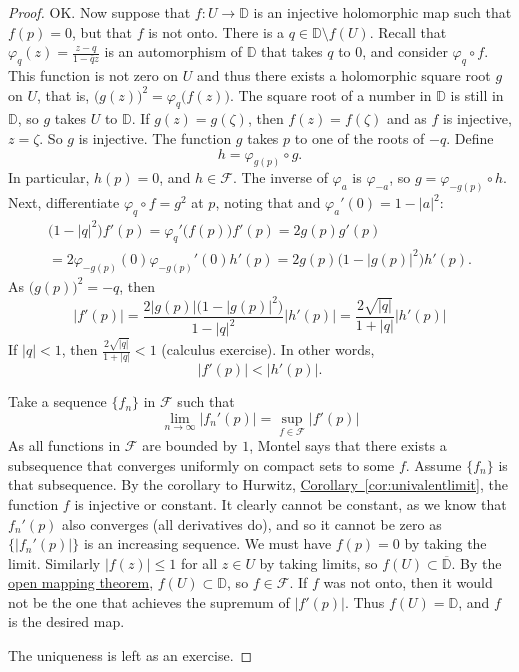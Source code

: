 \documentclass[12pt,openany]{book}
\newcommand{\sabs}[1]{\lvert {#1} \rvert}
\newcommand{\D}{{\mathbb{D}}}
\newcommand{\sF}{{\mathscr{F}}}
\theoremstyle{plain}
\theoremstyle{remark}
\theoremstyle{definition}
\theoremstyle{exercise}
\theoremstyle{example}
\newcommand{\corref}[1]{\hyperref[#1]{Corollary~\ref*{#1}}}
\begin{document}
\begin{proof}
OK.  Now suppose that $f \colon U \to \D$ is an injective holomorphic map
such that $f(p) = 0$, but that $f$ is not onto.  There is a
$q \in \D \setminus f(U)$.
Recall that
$\varphi_q(z) = \frac{z-q}{1-\bar{q}z}$ is an automorphism of $\D$ that
takes $q$ to $0$, and consider $\varphi_q \circ f$.  This function is not
zero on $U$ and thus
there exists a holomorphic square root $g$ on $U$, that is,
${\bigl(g(z)\bigr)}^2 = \varphi_q\bigl(f(z)\bigr)$.
The square root of a number in $\D$ is still in $\D$, so $g$
takes $U$ to $\D$.
If $g(z)=g(\zeta)$, then $f(z)=f(\zeta)$ and as
$f$ is injective, $z=\zeta$.  So $g$ is injective.  
The function $g$ takes $p$ to one of the roots of $-q$.
Define
\begin{equation*}
h = \varphi_{g(p)} \circ g .
\end{equation*}
In particular, $h(p) = 0$, and $h \in \sF$.
The inverse of $\varphi_a$ is $\varphi_{-a}$, so
$g = \varphi_{-g(p)} \circ h$.
Next, differentiate
$\varphi_q \circ f = g^2$ at $p$, noting that
and $\varphi_a'(0) = 1-\sabs{a}^2$:
\begin{multline*}
\bigl(1-\sabs{q}^2\bigr) f'(p)
= \varphi_q'\bigl(f(p)\bigr) f'(p)
= 2 g(p) g'(p)
\\
= 2 \varphi_{-g(p)} (0) \varphi_{-g(p)}'(0) h'(p)
= 2 g(p) \bigl(1-\sabs{g(p)}^2\bigr) h'(p) .
\end{multline*}
As ${\bigl(g(p)\bigr)}^2 = -q$, then
\begin{equation*}
\sabs{f'(p)} =
\frac{2 \sabs{g(p)} \bigl(1-\sabs{g(p)}^2\bigr)}{1-\sabs{q}^2} \sabs{h'(p)}
=
\frac{2 \sqrt{\sabs{q}}}{1+\sabs{q}} \sabs{h'(p)}
\end{equation*}
If $\sabs{q} < 1$, then $\frac{2 \sqrt{\sabs{q}}}{1+\sabs{q}} < 1$
(calculus exercise).
In other words,
\begin{equation*}
\sabs{f'(p)} < \sabs{h'(p)} .
\end{equation*}

Take a sequence $\{ f_n \}$ in
$\sF$ such that
\begin{equation*}
\lim_{n \to \infty} \sabs{f_n'(p)} = \sup_{f \in \sF} \sabs{f'(p)}
\end{equation*}
As all functions in $\sF$ are bounded by $1$,
Montel says that there exists a subsequence that converges uniformly on
compact sets to some $f$.  Assume $\{ f_n \}$ is that subsequence.
By the corollary to Hurwitz,
\corref{cor:univalentlimit},
the function $f$ is injective or constant.  It clearly cannot be constant,
as we know that $f_n'(p)$ also converges (all derivatives do), and so it
cannot be zero as 
$\bigl\{ \sabs{f_n'(p)} \bigr\}$ is an increasing sequence.
We must have $f(p) = 0$ by taking the limit.
Similarly 
$\sabs{f(z)} \leq 1$ for all $z \in U$ by taking limits,
so $f(U) \subset \overline{\D}$.
By the \hyperref[thm:OMT]{open mapping theorem}, $f(U) \subset \D$, so $f \in
\sF$.  If $f$ was not onto, then it would not be the one that achieves the
supremum of $\sabs{f'(p)}$.  Thus $f(U) = \D$, and $f$ is the desired map.

The uniqueness is left as an exercise.
\end{proof}
\end{document}
